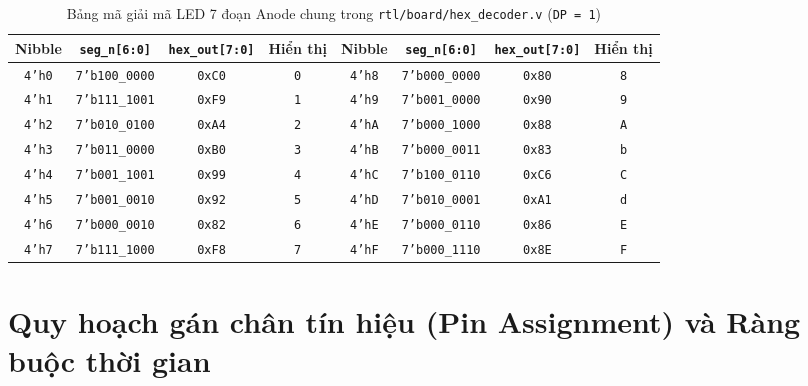 \documentclass[11pt,a4paper]{report}
\begin{document}
\begin{table}[!htb]
    \centering
    \caption{Bảng mã giải mã LED 7 đoạn Anode chung trong \texttt{rtl/board/hex\_decoder.v} (\texttt{DP = 1})}
    \label{tab:hex-lut}
    \scriptsize
    \setlength{\tabcolsep}{5pt}
    \renewcommand{\arraystretch}{1.05}
    \begin{tabular}{c c c c | c c c c}
        \toprule
        \textbf{Nibble} & \textbf{\texttt{seg\_n[6:0]}} & \textbf{\texttt{hex\_out[7:0]}} & \textbf{Hiển thị} & \textbf{Nibble} & \textbf{\texttt{seg\_n[6:0]}} & \textbf{\texttt{hex\_out[7:0]}} & \textbf{Hiển thị} \\
        \midrule
        \texttt{4'h0} & \texttt{7'b100\_0000} & \texttt{0xC0} & \texttt{0} & \texttt{4'h8} & \texttt{7'b000\_0000} & \texttt{0x80} & \texttt{8} \\
        \texttt{4'h1} & \texttt{7'b111\_1001} & \texttt{0xF9} & \texttt{1} & \texttt{4'h9} & \texttt{7'b001\_0000} & \texttt{0x90} & \texttt{9} \\
        \texttt{4'h2} & \texttt{7'b010\_0100} & \texttt{0xA4} & \texttt{2} & \texttt{4'hA} & \texttt{7'b000\_1000} & \texttt{0x88} & \texttt{A} \\
        \texttt{4'h3} & \texttt{7'b011\_0000} & \texttt{0xB0} & \texttt{3} & \texttt{4'hB} & \texttt{7'b000\_0011} & \texttt{0x83} & \texttt{b} \\
        \texttt{4'h4} & \texttt{7'b001\_1001} & \texttt{0x99} & \texttt{4} & \texttt{4'hC} & \texttt{7'b100\_0110} & \texttt{0xC6} & \texttt{C} \\
        \texttt{4'h5} & \texttt{7'b001\_0010} & \texttt{0x92} & \texttt{5} & \texttt{4'hD} & \texttt{7'b010\_0001} & \texttt{0xA1} & \texttt{d} \\
        \texttt{4'h6} & \texttt{7'b000\_0010} & \texttt{0x82} & \texttt{6} & \texttt{4'hE} & \texttt{7'b000\_0110} & \texttt{0x86} & \texttt{E} \\
        \texttt{4'h7} & \texttt{7'b111\_1000} & \texttt{0xF8} & \texttt{7} & \texttt{4'hF} & \texttt{7'b000\_1110} & \texttt{0x8E} & \texttt{F} \\
        \bottomrule
    \end{tabular}
\end{table}

\section{Quy hoạch gán chân tín hiệu (Pin Assignment) và Ràng buộc thời gian}
\label{sec:pin-assignment}
\end{document}
